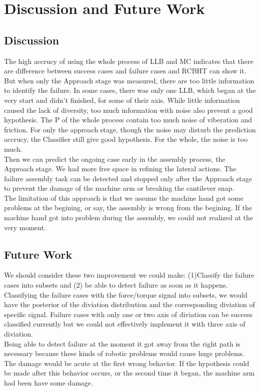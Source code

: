 \chapter{Discussion and Future Work}
\section{Discussion}
The high accrucy of using the whole process of LLB and MC indicates that there are difference between success cases and failure cases and RCBHT can show it. But when only the Approach stage was measured, there are too little information to identify the failure. In some cases, there was only one LLB, which began at the very start and didn't finished, for some of their axis. While little information caused the lack of diversity, too much information with noise also prevent a good hypothesis. The P of the whole process contain too much noise of viberation and friction. For only the approach stage, though the noise may disturb the prediction accrucy, the Classifier still give good hypothesis. For the whole, the noise is too much. \\
\indent Then we can predict the ongoing case early in the assembly process, the Approach stage. We had more free space in refining the lateral actions. The failure assembly task can be detected and stopped only after the Approach stage to prevent the damage of the machine arm or breaking the cantilever snap. \\ 
\indent The limitation of this approach is that we assume the machine hand got some problems at the begining, or say, the assembly is wrong from the begining. If the machine hand got into problem during the assembly, we could not realized at the very moment.
\section{Future Work}
We should consider these two improvement we could make: (1)Classify the failure cases into subsets and (2) be able to detect failure as soon as it happens. \\ 
\indent Classifying the failure cases with the force/torque signal into subsets, we would have the posterior of the diviation distribution and the corresponding diviation of specific signal. Failure cases with only one or two axis of diviation can be success classified currently but we could not effectively implement it with three axis of diviation. \\
\indent Being able to detect failure at the moment it got away from the right path is necessary because these kinds of robotic problems would cause huge problems. The damage would be acute at the first wrong behavior. If the hypothesis could be made after this behavior occurs, or the second time it began, the machine arm had been have some damage.   
